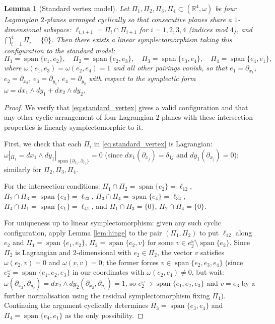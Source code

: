 \documentclass[12pt]{article}
\newtheorem{lemma}[theorem]{Lemma}
\theoremstyle{definition}
\DeclareMathOperator{\Span}{span}
\begin{document}
\begin{lemma}[Standard vertex model]
\label{lem:vertex_model}
Let $\Pi_1, \Pi_2, \Pi_3, \Pi_4 \subset (\mathbb{R}^4, \omega)$ be four Lagrangian $2$-planes arranged cyclically so that consecutive planes share a $1$-dimensional subspace: $\ell_{i,i+1} = \Pi_i \cap \Pi_{i+1}$ for $i = 1,2,3,4$ (indices mod $4$), and $\bigcap_{i=1}^4 \Pi_i = \{0\}$. Then there exists a linear symplectomorphism taking this configuration to the standard model:
\begin{equation}
\label{eq:standard_vertex}
  \Pi_1 = \Span\{e_1, e_2\},\quad
  \Pi_2 = \Span\{e_2, e_3\},\quad
  \Pi_3 = \Span\{e_3, e_4\},\quad
  \Pi_4 = \Span\{e_4, e_1\},
\end{equation}
where $\omega(e_1,e_3) = \omega(e_2,e_4) = 1$ and all other pairings vanish, so that $e_1 = \partial_{x_1}$, $e_2 = \partial_{x_2}$, $e_3 = \partial_{y_1}$, $e_4 = \partial_{y_2}$ with respect to the symplectic form $\omega = dx_1 \wedge dy_1 + dx_2 \wedge dy_2$.
\end{lemma}

\begin{proof}
We verify that \eqref{eq:standard_vertex} gives a valid configuration and that any other cyclic arrangement of four Lagrangian $2$-planes with these intersection properties is linearly symplectomorphic to it.

First, we check that each $\Pi_i$ in \eqref{eq:standard_vertex} is Lagrangian: $\omega|_{\Pi_1} = dx_1 \wedge dy_1|_{\Span\{\partial_{x_1}, \partial_{x_2}\}} = 0$ (since $dx_1(\partial_{x_j}) = \delta_{1j}$ and $dy_1(\partial_{x_j}) = 0$); similarly for $\Pi_2, \Pi_3, \Pi_4$.

For the intersection conditions: $\Pi_1 \cap \Pi_2 = \Span\{e_2\} = \ell_{12}$, $\Pi_2 \cap \Pi_3 = \Span\{e_3\} = \ell_{23}$, $\Pi_3 \cap \Pi_4 = \Span\{e_4\} = \ell_{34}$, $\Pi_4 \cap \Pi_1 = \Span\{e_1\} = \ell_{41}$, and $\Pi_1 \cap \Pi_3 = \{0\}$, $\Pi_2 \cap \Pi_4 = \{0\}$.

For uniqueness up to linear symplectomorphism: given any such cyclic configuration, apply Lemma \ref{lem:hinge} to the pair $(\Pi_1, \Pi_2)$ to put $\ell_{12}$ along $e_2$ and $\Pi_1 = \Span\{e_1,e_2\}$, $\Pi_2 = \Span\{e_2, v\}$ for some $v \in e_2^\omega \setminus \Span\{e_2\}$. Since $\Pi_2$ is Lagrangian and $2$-dimensional with $e_2 \in \Pi_2$, the vector $v$ satisfies $\omega(e_2,v)=0$ and $\omega(v,v)=0$; the former forces $v \in \Span\{e_2,e_3,e_4\}$ (since $e_2^\omega = \Span\{e_1,e_2,e_3\}$ in our coordinates with $\omega(e_2,e_4)\neq 0$, but wait: $\omega(\partial_{x_2}, \partial_{y_2}) = dx_2 \wedge dy_2(\partial_{x_2},\partial_{y_2}) = 1$, so $e_2^\omega \supset \Span\{e_1,e_2,e_3\}$ and $v = e_3$ by a further normalisation using the residual symplectomorphism fixing $\Pi_1$). Continuing the argument cyclically determines $\Pi_3 = \Span\{e_3,e_4\}$ and $\Pi_4 = \Span\{e_4,e_1\}$ as the only possibility.
\end{proof}
\end{document}
